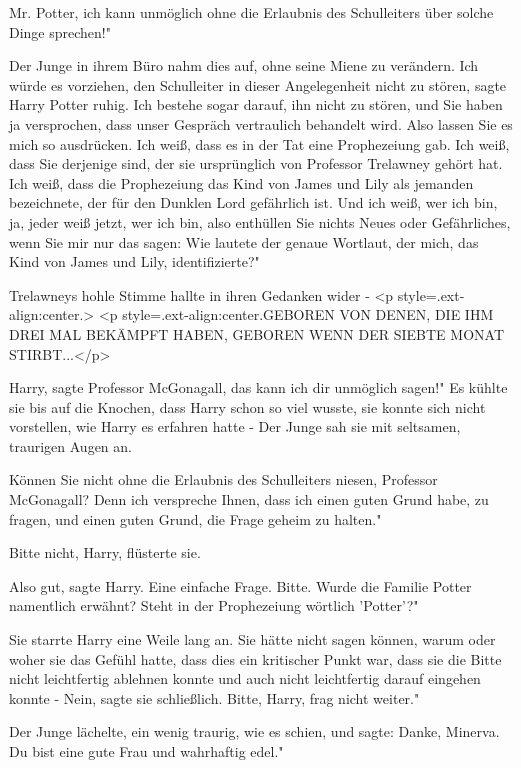 \glqq{}Mr. Potter, ich kann unmöglich ohne die Erlaubnis des Schulleiters über
solche Dinge sprechen!"

Der Junge in ihrem Büro nahm dies auf, ohne seine Miene zu verändern. \glqq{}Ich
würde es vorziehen, den Schulleiter in dieser Angelegenheit nicht zu
stören\grqq{}, sagte Harry Potter ruhig. \glqq{}Ich bestehe sogar darauf, ihn
nicht zu stören, und Sie haben ja versprochen, dass unser Gespräch vertraulich
behandelt wird. Also lassen Sie es mich so ausdrücken. Ich weiß, dass es in der
Tat eine Prophezeiung gab. Ich weiß, dass Sie derjenige sind, der sie
ursprünglich von Professor Trelawney gehört hat. Ich weiß, dass die Prophezeiung
das Kind von James und Lily als jemanden bezeichnete, der für den Dunklen Lord
gefährlich ist. Und ich weiß, wer ich bin, ja, jeder weiß jetzt, wer ich bin,
also enthüllen Sie nichts Neues oder Gefährliches, wenn Sie mir nur das sagen:
Wie lautete der genaue Wortlaut, der mich, das Kind von James und Lily,
identifizierte?"

Trelawneys hohle Stimme hallte in ihren Gedanken wider - <p
style=\grqq{}.ext-align:center\grqq{}.> <p
style=\grqq{}.ext-align:center\grqq{}.GEBOREN VON DENEN, DIE IHM DREI MAL
BEKÄMPFT HABEN, GEBOREN WENN DER SIEBTE MONAT STIRBT...</p>

\glqq{}Harry\grqq{}, sagte Professor McGonagall, \glqq{}das kann ich dir unmöglich
sagen!" Es kühlte sie bis auf die Knochen, dass Harry schon so viel wusste, sie
konnte sich nicht vorstellen, wie Harry es erfahren hatte - Der Junge sah sie
mit seltsamen, traurigen Augen an.

\glqq{}Können Sie nicht ohne die Erlaubnis des Schulleiters niesen, Professor
McGonagall? Denn ich verspreche Ihnen, dass ich einen guten Grund habe, zu
fragen, und einen guten Grund, die Frage geheim zu halten."

\glqq{}Bitte nicht, Harry\grqq{}, flüsterte sie.

\glqq{}Also gut\grqq{}, sagte Harry. \glqq{}Eine einfache Frage. Bitte. Wurde die
Familie Potter namentlich erwähnt? Steht in der Prophezeiung wörtlich 'Potter'?"

Sie starrte Harry eine Weile lang an. Sie hätte nicht sagen können, warum oder
woher sie das Gefühl hatte, dass dies ein kritischer Punkt war, dass sie die
Bitte nicht leichtfertig ablehnen konnte und auch nicht leichtfertig darauf
eingehen konnte - \glqq{}Nein\grqq{}, sagte sie schließlich. \glqq{}Bitte, Harry,
frag nicht weiter."

Der Junge lächelte, ein wenig traurig, wie es schien, und sagte: \glqq{}Danke,
Minerva. Du bist eine gute Frau und wahrhaftig edel."

